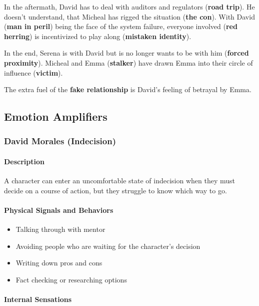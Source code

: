 In the aftermath, David has to deal with auditors and regulators (\textbf{road trip}).
He doesn't understand, that Micheal has rigged the situation (\textbf{the con}).
With David (\textbf{man in peril}) being the face of the system failure, everyone
involved (\textbf{red herring}) is incentivized to play along (\textbf{mistaken identity}).

In the end, Serena is with David but is no longer wants to be with him (\textbf{forced proximity}).
Micheal and Emma (\textbf{stalker}) have drawn Emma into their circle of influence 
(\textbf{victim}).

The extra fuel of the \textbf{fake relationship} is David's feeling of betrayal by Emma.




\subsection{Emotion Amplifiers}

\subsubsection{David Morales (Indecision)}

\paragraph{Description} A character can enter an uncomfortable state of indecision when they
must decide on a course of action, but they struggle to know which way to go.

\paragraph{Physical Signals and Behaviors}

\begin{itemize}
    \item Talking through with mentor
    \item Avoiding people who are waiting for the character's decision
    \item Writing down pros and cons
    \item Fact checking or researching options
\end{itemize}

\paragraph{Internal Sensations}

